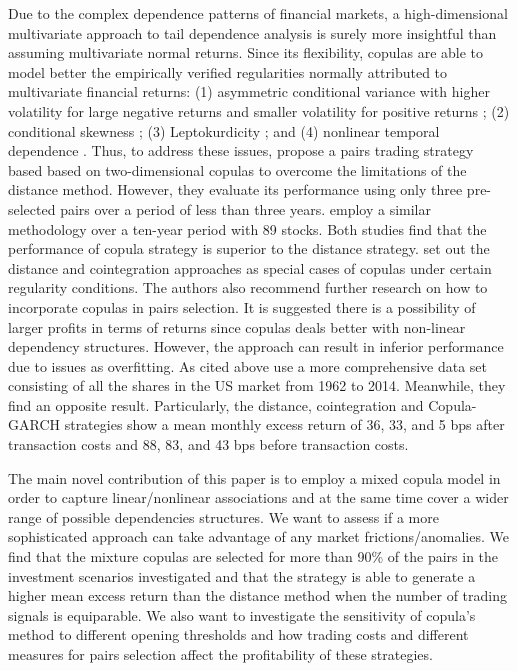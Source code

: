 \documentclass[a4paper]{article}
\begin{document}
Due to the complex dependence patterns of financial markets, a high-dimensional multivariate approach to tail dependence analysis is surely more insightful than assuming multivariate normal returns. Since its flexibility, copulas are able to model better the empirically verified regularities normally attributed to multivariate financial returns: (1) asymmetric conditional variance with higher volatility for large negative returns and smaller volatility for positive returns \citep{h98}; (2) conditional skewness \citep{ait01,chen01,patton01}; (3) Leptokurdicity \citep{t01,andreou01}; and (4) nonlinear temporal dependence \citep{cont01,campbell97}. Thus, to address these issues, \citet*{lw13} propose a pairs trading strategy based based on two-dimensional copulas to overcome the limitations of the distance method. However, they evaluate its performance using only three pre-selected pairs over a period of less than three years. \citet*{xie14} employ a similar methodology over a ten-year period with 89 stocks. Both studies find that the performance of copula strategy is superior to the distance strategy. \citet*{xw13} set out the distance and cointegration approaches as special cases of copulas under certain regularity conditions. The authors also recommend further research on how to incorporate copulas in pairs selection. It is suggested there is a possibility of larger profits in terms of returns since copulas deals better with non-linear dependency structures. However, the approach can result in inferior performance due to issues as overfitting. As cited above \citet*{rf15} use a more comprehensive data set consisting of all the shares in the US market from 1962 to 2014. Meanwhile, they find an opposite result. Particularly, the distance, cointegration and Copula-GARCH strategies show a mean monthly excess return of 36, 33, and 5 bps after transaction costs and 88, 83, and 43 bps before transaction costs.

The main novel contribution of this paper is to employ a mixed copula model in order to capture linear/nonlinear associations and at the same time cover a wider range of possible dependencies structures. We want to assess if a more sophisticated approach can take advantage of any market frictions/anomalies. We find that the mixture copulas are selected for more than 90\% of the pairs in the investment scenarios investigated and that the strategy is able 
to generate a higher mean excess return than the distance method when the 
number of trading signals is equiparable. We also want to investigate the sensitivity of copula's method to different opening thresholds and how trading costs and different measures for pairs selection affect the profitability of these strategies.
\end{document}
